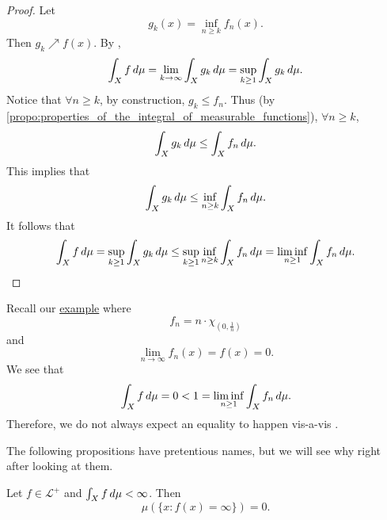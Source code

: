 \documentclass[notoc,notitlepage]{tufte-book}
\begin{document}
\begin{proof}
  Let
  \begin{equation*}
    g_k(x) = \inf_{n \geq k} f_n(x).
  \end{equation*}
  Then $g_k \nearrow f(x)$.
  By ,
  \begin{equation*}
    \int_{X} f \mathop{}\!d{\mu}
    = \lim_{k \to \infty} \int_{X} g_k \mathop{}\!d{\mu}
    = \sup_{k \geq 1} \int_{X} g_k \mathop{}\!d{\mu}.
  \end{equation*}
  Notice that $\forall n \geq k$, by construction, $g_k \leq f_n$.
  Thus (by \cref{propo:properties_of_the_integral_of_measurable_functions}),
  $\forall n \geq k$,
  \begin{equation*}
    \int_{X} g_k \mathop{}\!d{\mu} \leq \int_{X} f_n \mathop{}\!d{\mu}.
  \end{equation*}
  This implies that
  \begin{equation*}
    \int_{X} g_k \mathop{}\!d{\mu} \leq \inf_{n \geq k} \int_{X} f_n \mathop{}\!d{\mu}.
  \end{equation*}
  It follows that
  \begin{align*}
    \int_{X} f \mathop{}\!d{\mu}
    = \sup_{k \geq 1} \int_{X} g_k \mathop{}\!d{\mu}
    \leq \sup_{k \geq 1} \inf_{n \geq k} \int_{X} f_n \mathop{}\!d{\mu}
    = \liminf_{n \geq 1} \int_{X} f_n \mathop{}\!d{\mu}.
  \end{align*}
\end{proof}

\begin{eg}
  Recall our \hyperref[eg:fatou_s_lemma_strict_inequality]{example} where
  \begin{equation*}
    f_n = n \cdot \chi_{\left( 0, \frac{1}{n} \right) }
  \end{equation*}
  and
  \begin{equation*}
    \lim_{n \to \infty} f_n(x) = f(x) = 0.
  \end{equation*}
  We see that
  \begin{equation*}
    \int_{X} f \mathop{}\!d{\mu} = 0 < 1 = \liminf_{n \geq 1} \int_{X} f_n \mathop{}\!d{\mu}.
  \end{equation*}
  Therefore, we do not always expect an equality to happen vis-a-vis
  .
\end{eg}

The following propositions have pretentious names,
but we will see why right after looking at them.

\begin{propo}\label{propo:integrable_functions_have_value_at_infinity_over_a_set_of_measure_zero}
  Let $f \in \mathcal{L}^+$ and $\int_{X} f \mathop{}\!d{\mu} < \infty$.
  Then
  \begin{equation*}
    \mu ( \{ x : f(x) = \infty \} ) = 0.
  \end{equation*}
\end{propo}
\end{document}
